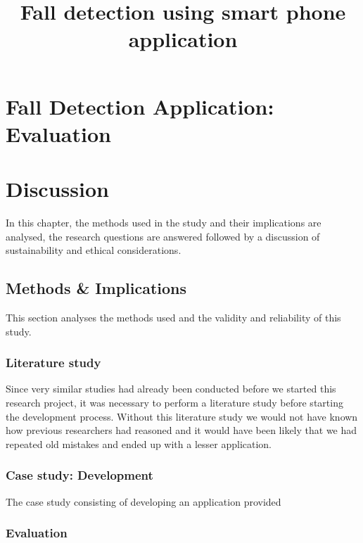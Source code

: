 \documentclass[12pt, a4paper, onecolumn]{article}
\begin{document}
	
	\title{Fall detection using smart phone application}
	\maketitle
	
	\tableofcontents
	
	\newpage
	
	\section{Fall Detection Application: Evaluation}
	\newpage
	
	\section{Discussion}
	
	In this chapter, the methods used in the study and their implications are analysed, the research questions are answered followed by a discussion of sustainability and ethical considerations.
	
	\subsection{Methods \& Implications}
	
	This section analyses the methods used and the validity and reliability of this study.
	
	\subsubsection{Literature study}
	
	Since very similar studies had already been conducted before we started this research project, it was necessary to perform a literature study before starting the development process. Without this literature study we would not have known how previous researchers had reasoned and it would have been likely that we had repeated old mistakes and ended up with a lesser application.
	
	\subsubsection{Case study: Development}
	
	The case study consisting of developing an application provided
	
	\subsubsection{Evaluation}
	
\end{document}
